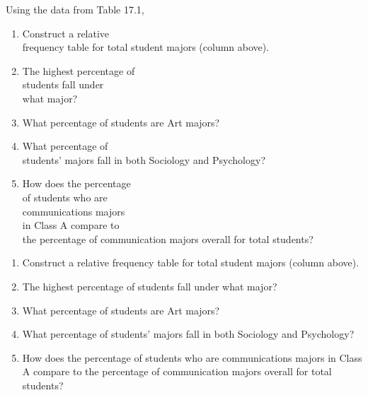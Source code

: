 \documentclass[11pt]{book}\usepackage[]{graphicx}\usepackage[]{color}
\begin{document}
\begin{exercises}
\begin{exercise}
\begin{minipage}[ht]{5.8cm}
    Using the data from Table 17.1,

\begin{enumerate}
  \item Construct a  relative \\ frequency table for total student majors (column above).
  \item	The highest percentage of \\ students fall under \\ what major?
  \item	What percentage of students are Art majors?
  \item	What percentage of \\ students'  majors fall in both Sociology and Psychology?
  \item	How does the percentage \\ of students who are  \\ communications  majors \\ in Class A compare to \\ the  percentage of   communication majors  overall for total students? 
\end{enumerate}

\end{minipage}

    \end{exercise}
    \begin{solution}
      
  \begin{enumerate}
  \item Construct a relative frequency table for total student majors (column above).
  \item	The highest percentage of students fall under what major?
  \item	What percentage of students are Art majors?
  \item	What percentage of  students’ majors fall in both Sociology and Psychology?
  \item	How does the percentage of students who are communications majors in Class A compare to the percentage of communication majors overall for total students? 
\end{enumerate}  

    \end{solution}
  
\clearpage

    \begin{exercise}  %

    \begin{center}


\end{center}
\end{exercise}
\end{exercises}
\end{document}
